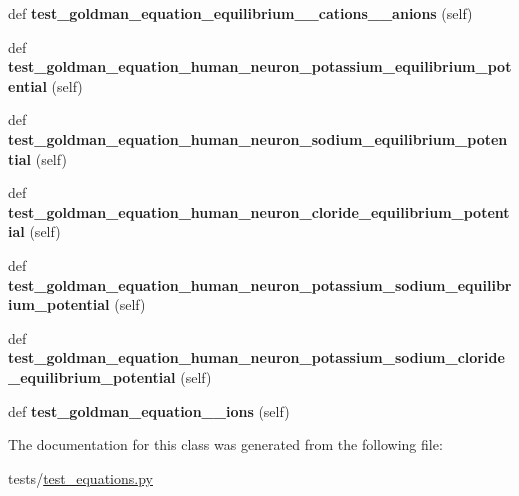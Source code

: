 \begin{DoxyCompactItemize}
def {\bfseries test\+\_\+goldman\+\_\+equation\+\_\+equilibrium\+\_\+\_\+cations\+\_\+\_\+anions} (self)
\item 
\mbox{\label{classtest__equations_1_1TestGoldmanEquation_a595e120edc107b8d638008c5e9b75dbe}} 
def {\bfseries test\+\_\+goldman\+\_\+equation\+\_\+human\+\_\+neuron\+\_\+potassium\+\_\+equilibrium\+\_\+potential} (self)
\item 
\mbox{\label{classtest__equations_1_1TestGoldmanEquation_af969126e3f846432cf1bc74b97695143}} 
def {\bfseries test\+\_\+goldman\+\_\+equation\+\_\+human\+\_\+neuron\+\_\+sodium\+\_\+equilibrium\+\_\+potential} (self)
\item 
\mbox{\label{classtest__equations_1_1TestGoldmanEquation_a26f411740e2ff6a2d067c225725c21b5}} 
def {\bfseries test\+\_\+goldman\+\_\+equation\+\_\+human\+\_\+neuron\+\_\+cloride\+\_\+equilibrium\+\_\+potential} (self)
\item 
\mbox{\label{classtest__equations_1_1TestGoldmanEquation_a33502b54a14e6a6cc2fed124b9f8feea}} 
def {\bfseries test\+\_\+goldman\+\_\+equation\+\_\+human\+\_\+neuron\+\_\+potassium\+\_\+sodium\+\_\+equilibrium\+\_\+potential} (self)
\item 
\mbox{\label{classtest__equations_1_1TestGoldmanEquation_ad274815885b016250dc154a48c757b6c}} 
def {\bfseries test\+\_\+goldman\+\_\+equation\+\_\+human\+\_\+neuron\+\_\+potassium\+\_\+sodium\+\_\+cloride\+\_\+equilibrium\+\_\+potential} (self)
\item 
\mbox{\label{classtest__equations_1_1TestGoldmanEquation_a652e23e9d3b3490d704482625595f037}} 
def {\bfseries test\+\_\+goldman\+\_\+equation\+\_\+\_\+ions} (self)
\end{DoxyCompactItemize}


The documentation for this class was generated from the following file\+:\begin{DoxyCompactItemize}
\item 
tests/\hyperlink{test__equations_8py}{test\+\_\+equations.\+py}\end{DoxyCompactItemize}
